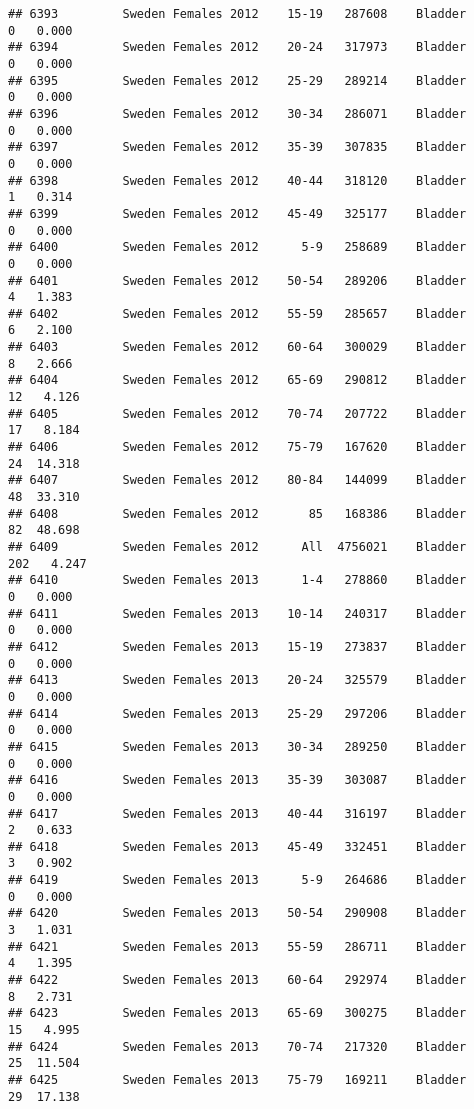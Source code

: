 \documentclass[
]{article}
\begin{document}
\begin{verbatim}
## 6393         Sweden Females 2012    15-19   287608    Bladder      0   0.000
## 6394         Sweden Females 2012    20-24   317973    Bladder      0   0.000
## 6395         Sweden Females 2012    25-29   289214    Bladder      0   0.000
## 6396         Sweden Females 2012    30-34   286071    Bladder      0   0.000
## 6397         Sweden Females 2012    35-39   307835    Bladder      0   0.000
## 6398         Sweden Females 2012    40-44   318120    Bladder      1   0.314
## 6399         Sweden Females 2012    45-49   325177    Bladder      0   0.000
## 6400         Sweden Females 2012      5-9   258689    Bladder      0   0.000
## 6401         Sweden Females 2012    50-54   289206    Bladder      4   1.383
## 6402         Sweden Females 2012    55-59   285657    Bladder      6   2.100
## 6403         Sweden Females 2012    60-64   300029    Bladder      8   2.666
## 6404         Sweden Females 2012    65-69   290812    Bladder     12   4.126
## 6405         Sweden Females 2012    70-74   207722    Bladder     17   8.184
## 6406         Sweden Females 2012    75-79   167620    Bladder     24  14.318
## 6407         Sweden Females 2012    80-84   144099    Bladder     48  33.310
## 6408         Sweden Females 2012       85   168386    Bladder     82  48.698
## 6409         Sweden Females 2012      All  4756021    Bladder    202   4.247
## 6410         Sweden Females 2013      1-4   278860    Bladder      0   0.000
## 6411         Sweden Females 2013    10-14   240317    Bladder      0   0.000
## 6412         Sweden Females 2013    15-19   273837    Bladder      0   0.000
## 6413         Sweden Females 2013    20-24   325579    Bladder      0   0.000
## 6414         Sweden Females 2013    25-29   297206    Bladder      0   0.000
## 6415         Sweden Females 2013    30-34   289250    Bladder      0   0.000
## 6416         Sweden Females 2013    35-39   303087    Bladder      0   0.000
## 6417         Sweden Females 2013    40-44   316197    Bladder      2   0.633
## 6418         Sweden Females 2013    45-49   332451    Bladder      3   0.902
## 6419         Sweden Females 2013      5-9   264686    Bladder      0   0.000
## 6420         Sweden Females 2013    50-54   290908    Bladder      3   1.031
## 6421         Sweden Females 2013    55-59   286711    Bladder      4   1.395
## 6422         Sweden Females 2013    60-64   292974    Bladder      8   2.731
## 6423         Sweden Females 2013    65-69   300275    Bladder     15   4.995
## 6424         Sweden Females 2013    70-74   217320    Bladder     25  11.504
## 6425         Sweden Females 2013    75-79   169211    Bladder     29  17.138

\end{verbatim}
\end{document}
